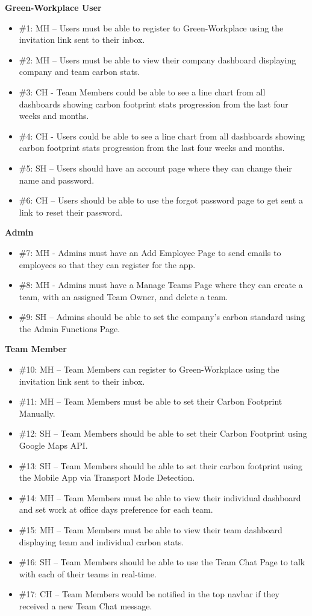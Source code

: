 \documentclass{l4proj}
\begin{document}
\textbf{Green-Workplace User}
\begin{itemize}
    \item \#1: MH – Users must be able to register to Green-Workplace using the invitation link sent to their inbox.
    \item \#2: MH – Users must be able to view their company dashboard displaying company and team carbon stats.
    \item \#3: CH - Team Members could be able to see a line chart from all dashboards showing carbon footprint stats progression from the last four weeks and months.
    \item \#4: CH - Users could be able to see a line chart from all dashboards showing carbon footprint stats progression from the last four weeks and months.
    \item \#5: SH – Users should have an account page where they can change their name and password.
    \item \#6: CH – Users should be able to use the forgot password page to get sent a link to reset their password.
\end{itemize}

\textbf{Admin}
\begin{itemize}
    \item \#7: MH - Admins must have an Add Employee Page to send emails to employees so that they can register for the app.
    \item \#8: MH - Admins must have a Manage Teams Page where they can create a team, with an assigned Team Owner, and delete a team.
    \item \#9: SH – Admins should be able to set the company’s carbon standard using the Admin Functions Page.
\end{itemize}

\textbf{Team Member}
\begin{itemize}
    \item \#10: MH – Team Members can register to Green-Workplace using the invitation link sent to their inbox.
    \item \#11: MH – Team Members must be able to set their Carbon Footprint Manually.
    \item \#12: SH – Team Members should be able to set their Carbon Footprint using Google Maps API.
    \item \#13: SH – Team Members should be able to set their carbon footprint using the Mobile App via Transport Mode Detection.
    \item \#14: MH – Team Members must be able to view their individual dashboard and set work at office days preference for each team.
    \item \#15: MH – Team Members must be able to view their team dashboard displaying team and individual carbon stats.
    \item \#16: SH – Team Members should be able to use the Team Chat Page to talk with each of their teams in real-time.
    \item \#17: CH – Team Members would be notified in the top navbar if they received a new Team Chat message.
\end{itemize}
\end{document}
